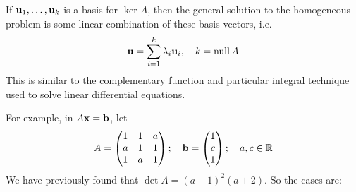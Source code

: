 \documentclass{article}
\begin{document}
If $\vb u_1, \dots, \vb u_k$ is a basis for $\ker A$, then the general solution to the homogeneous problem is some linear combination of these basis vectors, i.e.
\[ \vb u = \sum_{i=1}^k \lambda_i \vb u_i,\quad k = \operatorname{null} A \]
This is similar to the complementary function and particular integral technique used to solve linear differential equations.

For example, in $A\vb x = \vb b$, let
\[ A = \begin{pmatrix}
        1 & 1 & a \\ a & 1 & 1 \\ 1 & a & 1
    \end{pmatrix};\quad \vb b = \begin{pmatrix}
        1 \\ c \\ 1
    \end{pmatrix};\quad a, c \in \mathbb R \]
We have previously found that $\det A = (a-1)^2(a+2)$. So the cases are:
\end{document}
